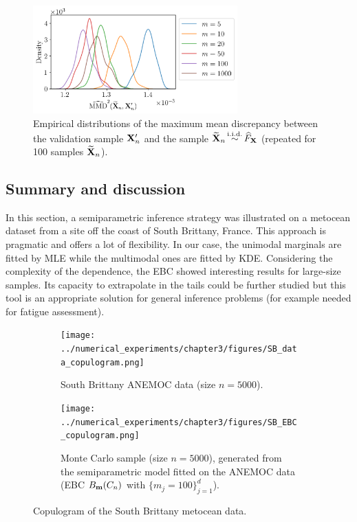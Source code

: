 \begin{figure}
    \centering
    \includegraphics[width=0.7\textwidth]{../numerical_experiments/chapter3/figures/SB_MMD_goodness.png}
    \caption{Empirical distributions of the maximum mean discrepancy between the validation sample ${\bf X}_n'$ and the sample $\widetilde{{\bf X}}_n \mathop{\sim}\limits^{\mathrm{i.i.d.}} \widehat{F}_{\bf X}$ (repeated for 100 samples $\widetilde{{\bf X}}_n$).}
    \label{fig:sb_ebc_mmd}
\end{figure}


\subsection{Summary and discussion}
In this section, a semiparametric inference strategy was illustrated on a metocean dataset from a site off the coast of South Brittany, France. 
This approach is pragmatic and offers a lot of flexibility. 
In our case, the unimodal marginals are fitted by MLE while the multimodal ones are fitted by KDE. 
Considering the complexity of the dependence, the EBC showed interesting results for large-size samples. 
Its capacity to extrapolate in the tails could be further studied \citep{heredia_2022_nonparam_copula} but this tool is an appropriate solution for general inference problems (for example needed for fatigue assessment). 

\begin{landscape}
    \begin{figure}
        \begin{subfigure}[b]{0.49\linewidth}
            \centering
            \texttt{[image: ../numerical\_experiments/chapter3/figures/SB\_data\_copulogram.png]}
            \vspace*{2pt}
            \caption{South Brittany ANEMOC data (size $n=5000$).}
        \end{subfigure}
        \begin{subfigure}[b]{0.49\linewidth}
            \centering
            \texttt{[image: ../numerical\_experiments/chapter3/figures/SB\_EBC\_copulogram.png]}
            \caption{Monte Carlo sample (size $n=5000$), generated from the semiparametric model fitted on the ANEMOC data (EBC $B_{{\bf m}}(C_n)$ with $ \{m_j=100\}_{j=1}^d$).}
        \end{subfigure}
        \vspace*{5pt} 
        \caption{Copulogram of the South Brittany metocean data.}
        \label{fig:sb_copulograms}
    \end{figure}
\end{landscape}






